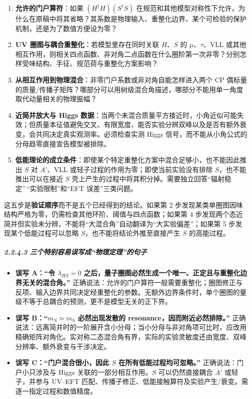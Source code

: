 \documentclass[
  chinese,
  UTF8]{ctexart}
\providecommand{\tightlist}{%
  \setlength{\itemsep}{0pt}\setlength{\parskip}{0pt}}
\begin{document}
\begin{enumerate}
\def\labelenumi{\arabic{enumi}.}
\tightlist
\item
  \textbf{允许的门户算符}：如果 \((H^\dagger H)(S^\dagger S)\)
  在规范和其他模型对称性下允许，为什么在原稿中将其省略？其系数是物理输入、重整化边界、某个可检验的保护机制，还是为了数值方便设为零？
\item
  \textbf{UV 圈图与耦合重整化}：若模型里存在同时关联 \(H\)、\(S\) 的
  \ensuremath{\mu}、\ensuremath{\tau}、VLL
  或其他相互作用，则相关四点函数、非对角二点函数在什么圈阶第一次非零？分别怎样受味结构、手征、规范荷与重整化方案影响？
\item
  \textbf{从相互作用到物理混合}：非零门户系数或非对角自能怎样进入两个 CP
  偶标量的质量/传播子矩阵？哪部分可以用树级混合角描述，哪部分不能用单一角度取代动量相关的物理振幅？
\item
  \textbf{近简并放大与 Higgs
  数据}：当两个未混合质量平方接近时，小角近似可能失效；但质量本征值避免交叉、有限宽度、能否实验分辨双峰以及是否有额外衰变，会共同决定真实观测率。必须检查实测
  Higgs 信号，而不能从小角公式的分母趋零直接宣告模型被排除。
\item
  \textbf{低能理论的成立条件}：即使某个特定重整化方案中混合足够小，也不能因此推出
  \(S\) 对 \(A'\)、VLL 或轻子过程的作用为零；即使当前实验没有排除
  \(S\)，也不能推出可以在接近 \(S\)
  壳上产生的过程中将其积分掉。需要独立回答``辐射稳定''\,``实验限制''和``EFT
  误差''三类问题。
\end{enumerate}

这五步是\textbf{验证顺序}而不是五个已经得到的结论。如果第 2
步发现某类单圈图因味结构严格为零，仍需检查其他环阶、阈值与四点函数；如果第
4
步发现两个态近简并但实验未分辨，不能将``大混合角''自动翻译为``大实验偏差''；如果第
5 步发现某个低能过程可以忽略 \(S\)，也不能将结论外推至直接产生 \(S\)
的高能过程。

\subparagraph{2.2.4.3
三个特别容易误写成``物理定理''的句子}\label{ux4e09ux4e2aux7279ux522bux5bb9ux6613ux8befux5199ux6210ux7269ux7406ux5b9aux7406ux7684ux53e5ux5b50}

\begin{itemize}
\tightlist
\item
  \textbf{误写 A：``令 \(\lambda_{HS}=0\)
  之后，量子圈图必然生成一个唯一、正定且与重整化边界无关的混合角。''}
  正确说法：允许的门户算符一般需要重整化；圈图修正与反项、输入边界共同决定经重整化的参数。无额外边界条件时，单个圈图的量级不等于总耦合的预测，更不是模型无关的正下界。
\item
  \textbf{误写 B：``\(m_S\simeq m_h\) 必然出现发散的
  resonance，因而附近必然排除。''}
  正确说法：远离简并时的一阶展开含小分母；当小分母与非对角项可比时，应改用精确矩阵对角化。实对称二态混合角有界，实际的实验灵敏度还由宽度、双峰分辨率、额外衰变与干涉决定。
\item
  \textbf{误写 C：``门户混合很小，因此 \(S\) 在所有低能过程均可忽略。''}
  正确说法：门户小只涉及与 Higgs 关联的一部分相互作用。\(S\)
  可以仍然直接耦合 \(A'\) 或轻子，并参与 UV--EFT
  匹配、传播子修正、低能接触算符及实验产生/衰变。需逐一指定过程和数值精度。
\end{itemize}
\end{document}
